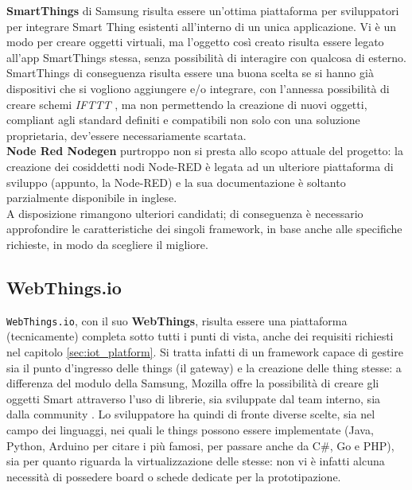 \documentclass[12pt,a4paper,openright,oneside]{report}
\begin{document}
\textbf{SmartThings} di Samsung risulta essere un'ottima piattaforma per sviluppatori per integrare Smart Thing esistenti all'interno di un unica applicazione. Vi è un modo per creare oggetti virtuali, ma l'oggetto così creato risulta essere legato all'app SmartThings stessa, senza possibilità di interagire con qualcosa di esterno. SmartThings di conseguenza risulta essere una buona scelta se si hanno già dispositivi che si vogliono aggiungere e/o integrare, con l'annessa possibilità di creare schemi \textit{IFTTT} \cite{ifttt}, ma non permettendo la creazione di nuovi oggetti, compliant agli standard definiti e compatibili non solo con una soluzione proprietaria, dev'essere necessariamente scartata.\\

\textbf{Node Red Nodegen} purtroppo non si presta allo scopo attuale del progetto: la creazione dei cosiddetti nodi Node-RED è legata ad un ulteriore piattaforma di sviluppo (appunto, la Node-RED) e la sua documentazione è soltanto parzialmente disponibile in inglese.\\

A disposizione rimangono ulteriori candidati; di conseguenza è necessario approfondire le caratteristiche dei singoli framework, in base anche alle specifiche richieste, in modo da scegliere il migliore.\\


\subsection{WebThings.io}
\label{sec:webthingsio}
\texttt{WebThings.io}, con il suo \textbf{WebThings}, risulta essere una piattaforma (tecnicamente) completa sotto tutti i punti di vista, anche dei requisiti richiesti nel capitolo \ref{sec:iot_platform}. Si tratta infatti di un framework capace di gestire sia il punto d'ingresso delle things (il gateway) e la creazione delle thing stesse: a differenza del modulo della Samsung, Mozilla offre la possibilità di creare gli oggetti Smart attraverso l'uso di librerie, sia sviluppate dal team interno, sia dalla community \cite{webthings}. Lo sviluppatore ha quindi di fronte diverse scelte, sia nel campo dei linguaggi, nei quali le things possono essere implementate (Java, Python, Arduino per citare i più famosi, per passare anche da C\#, Go e PHP), sia per quanto riguarda la virtualizzazione delle stesse: non vi è infatti alcuna necessità di possedere board o schede dedicate per la prototipazione.\\
\end{document}
